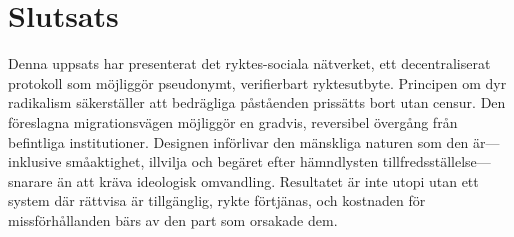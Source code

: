 \documentclass[11pt,a4paper,twocolumn]{article}
\begin{document}
\section{Slutsats}

Denna uppsats har presenterat det ryktes-sociala nätverket, ett decentraliserat protokoll som möjliggör pseudonymt, verifierbart ryktesutbyte. Principen om dyr radikalism säkerställer att bedrägliga påståenden prissätts bort utan censur. Den föreslagna migrationsvägen möjliggör en gradvis, reversibel övergång från befintliga institutioner. Designen införlivar den mänskliga naturen som den är---inklusive småaktighet, illvilja och begäret efter hämndlysten tillfredsställelse---snarare än att kräva ideologisk omvandling. Resultatet är inte utopi utan ett system där rättvisa är tillgänglig, rykte förtjänas, och kostnaden för missförhållanden bärs av den part som orsakade dem.


\end{document}
